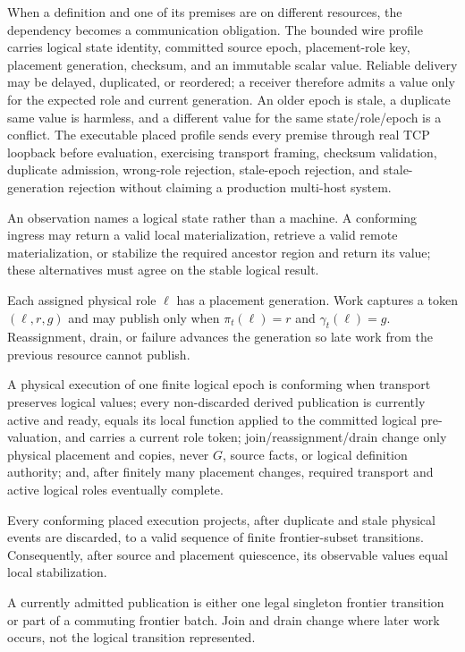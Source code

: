 When a definition and one of its premises are on different resources, the dependency becomes a communication obligation. The bounded wire profile carries logical state identity, committed source epoch, placement-role key, placement generation, checksum, and an immutable scalar value. Reliable delivery may be delayed, duplicated, or reordered; a receiver therefore admits a value only for the expected role and current generation. An older epoch is stale, a duplicate same value is harmless, and a different value for the same state/role/epoch is a conflict. The executable placed profile sends every premise through real TCP loopback before evaluation, exercising transport framing, checksum validation, duplicate admission, wrong-role rejection, stale-epoch rejection, and stale-generation rejection without claiming a production multi-host system.

An observation names a logical state rather than a machine. A conforming ingress may return a valid local materialization, retrieve a valid remote materialization, or stabilize the required ancestor region and return its value; these alternatives must agree on the stable logical result.

Each assigned physical role $\ell$ has a placement generation. Work captures a token $(\ell,r,g)$ and may publish only when $\pi_t(\ell)=r$ and $\gamma_t(\ell)=g$. Reassignment, drain, or failure advances the generation so late work from the previous resource cannot publish.

\begin{definition}\label{def:placed}
A physical execution of one finite logical epoch is conforming when transport preserves logical values; every non-discarded derived publication is currently active and ready, equals its local function applied to the committed logical pre-valuation, and carries a current role token; join/reassignment/drain change only physical placement and copies, never $G$, source facts, or logical definition authority; and, after finitely many placement changes, required transport and active logical roles eventually complete.
\end{definition}
\begin{theorem}\label{thm:join}
Every conforming placed execution projects, after duplicate and stale physical events are discarded, to a valid sequence of finite frontier-subset transitions. Consequently, after source and placement quiescence, its observable values equal local stabilization.
\end{theorem}
A currently admitted publication is either one legal singleton frontier transition or part of a commuting frontier batch. Join and drain change where later work occurs, not the logical transition represented.

